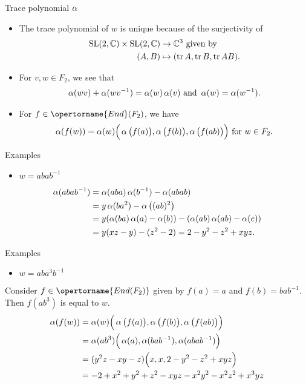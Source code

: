 \documentclass[aspectratio={169}]{beamer}
\begin{document}
\begin{frame}{Trace polynomial $\operatorname{\alpha}$}
\begin{itemize}
\item The trace polynomial of $w$ is unique because of the surjectivity of
\begin{align*}
    \operatorname{SL}(2,\mathbb{C}) \times \operatorname{SL}(2,\mathbb{C}) &\rightarrow \mathbb{C}^3 
    \text{ given by }\\
    (A,B) &\mapsto (\operatorname{tr} A, \operatorname{tr} B, \operatorname{tr} AB).
\end{align*}
\item For $v,w \in F_2$, we see that \begin{align*}
\operatorname{\alpha}(wv)+\operatorname{\alpha}(w v^{-1})=\operatorname{\alpha}(w)\operatorname{\alpha}(v) \text{ and } \operatorname{\alpha}(w)=\operatorname{\alpha}(w^{-1}).
\end{align*}
\item For $f\in\opertorname{End}(F_2)$, we have
\begin{equation*}
\operatorname{\alpha}(f(w)) = \operatorname{\alpha}(w)\Big( \operatorname{\alpha}\big(f(a) \big), \operatorname{\alpha} \big( f(b) \big), \operatorname{\alpha} \big( f(ab) \big) \Big) \text{ for } w\in F_2.
\end{equation*}
\end{itemize}
\end{frame}
\begin{frame}{Examples}
\begin{itemize}
    \item  $w = abab^{-1}$
\end{itemize}
\begin{align*}
\operatorname{\alpha}(abab^{-1}) &= \operatorname{\alpha}(aba) \operatorname{\alpha}(b^{-1}) - \operatorname{\alpha}(abab) \\ 
&= y\operatorname{\alpha}(ba^2) - \operatorname{\alpha} \big( (ab)^2 \big) \\
&= y(\operatorname{\alpha}(ba)\operatorname{\alpha}(a) - \operatorname{\alpha}(b)) - (\operatorname{\alpha}(ab)\operatorname{\alpha}(ab) - \operatorname{\alpha}(e)) \\
&= y(xz-y) - (z^2 - 2) = 2 - y^2 - z^2 + xyz.
\end{align*}
\end{frame}

\begin{frame}{Examples}
\begin{itemize}
    \item  $w = aba^3b^{-1}$
\end{itemize}
\vskip 0.5cm
Consider $f\in \opertorname{End(F_2)}$ given by $f(a)=a$ and $f(b)=bab^{-1}$. 
\\Then $f(ab^3)$ is equal to $w$.
\begin{align*}
\operatorname{\alpha}(f(w)) 
&= 
\operatorname{\alpha}(w)\Big( \operatorname{\alpha}\big(f(a) \big), \operatorname{\alpha} \big( f(b) \big), \operatorname{\alpha} \big( f(ab) \big) \Big) \\
&= \operatorname{\alpha}(ab^{3}) \Big( \operatorname{\alpha}(a), \operatorname{\alpha}(bab^{-1}), \operatorname{\alpha}(abab^{-1}) \Big) \\
&= (y^2z - xy - z) \Big(x, x, 2-y^2-z^2+xyz \Big) \\
&= -2 + x^2+y^2+z^2 - xyz - x^2y^2 - x^2z^2 + x^3yz 
\end{align*}
\end{frame}
\end{document}
